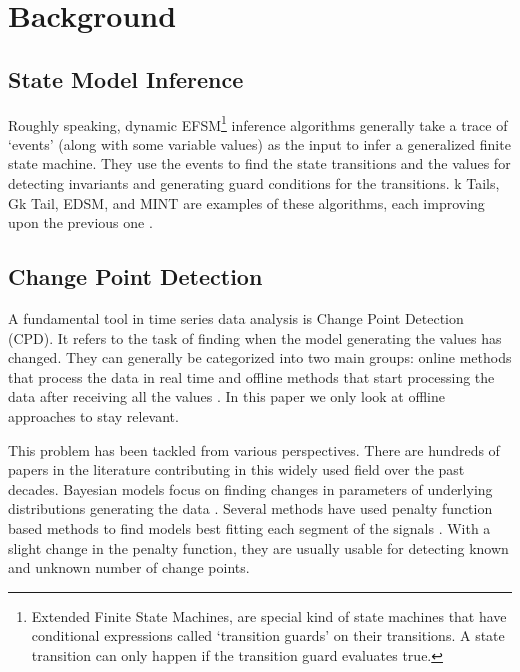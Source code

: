 \section{Background}
\subsection{State Model Inference}
Roughly speaking, dynamic EFSM\footnote{Extended Finite State Machines, are special kind of state machines that have conditional expressions called `transition guards' on their transitions. A state transition can only happen if the transition guard evaluates true.} inference algorithms generally take a trace of `events' (along with some variable values) as the input \cite{walkinshaw2016inferring} to infer a generalized finite state machine. They use the events to find the state transitions and the values for detecting invariants and generating guard  conditions for the transitions. 
k Tails, Gk Tail, EDSM, and MINT are examples of these algorithms, each improving upon the previous one \cite{biermann1972synthesis, lorenzoli2008automatic, lang1998results, walkinshaw2016inferring}.


\subsection{Change Point Detection}
A fundamental tool in time series data analysis is Change Point Detection (CPD). It refers to the task of finding when the model generating the values has changed. 
They can generally be categorized into two main groups: online methods that process the data in real time and offline methods that start processing the data after receiving all the values  \cite{Truong2018ChangePointSurvey}. 
In this paper we only look at offline approaches to stay relevant.


This problem has been tackled from various perspectives. There are hundreds of papers in the literature contributing in this widely used field over the past decades. \cite{chen2011parametric, hasan2014information, hsu1982bayesian, lee2017implicit, oh2002analyzing, ramos2016anomalies, reeves2007review, rosenfield2010change, wang2011non, xie2013sequential, yamanishi2004line, Lavielle1999} Bayesian models focus on finding changes in parameters of underlying distributions generating the data \cite{Lee2018TimeSeriesSegmentation, adams2007bayesian, bai1997estimation, barry1993bayesian, erdman2008fast, ray2002bayesian}. Several methods have used penalty function based methods to find models best fitting each segment of the signals \cite{Lavielle1999, lavielle2005using, keshavarz2018optimal, pein2017heterogeneous}. With a slight change in the penalty function, they are usually usable for detecting known and unknown number of change points. 

